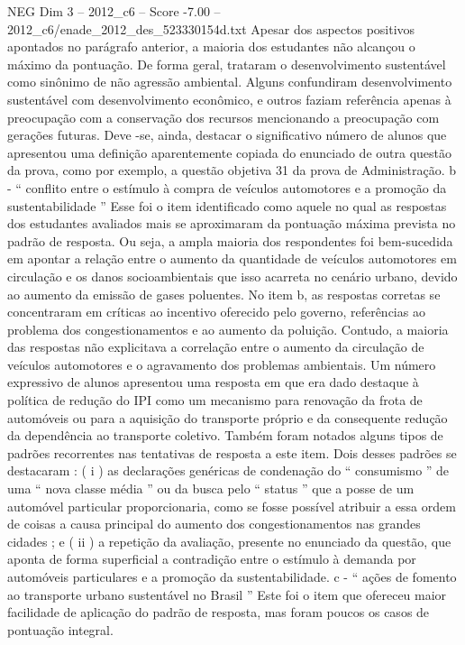 \begin{textsample}{NEG Dim 3 – 2012\_c6 – Score -7.00 – 2012\_c6/enade\_2012\_des\_523330154d.txt}
Apesar dos aspectos positivos apontados no parágrafo anterior, a maioria dos estudantes não alcançou o máximo da pontuação.
De forma geral, trataram o desenvolvimento sustentável como sinônimo de não agressão ambiental.
Alguns confundiram desenvolvimento sustentável com desenvolvimento econômico, e outros faziam referência apenas à preocupação com a conservação dos recursos mencionando a preocupação com gerações futuras.
Deve -se, ainda, destacar o significativo número de alunos que apresentou uma definição aparentemente copiada do enunciado de outra questão da prova, como por exemplo, a questão objetiva 31 da prova de Administração. b - “ conflito entre o estímulo à compra de veículos automotores e a promoção da sustentabilidade ” Esse foi o item identificado como aquele no qual as respostas dos estudantes avaliados mais se aproximaram da pontuação máxima prevista no padrão de resposta.
Ou seja, a ampla maioria dos respondentes foi bem-sucedida em apontar a relação entre o aumento da quantidade de veículos automotores em circulação e os danos socioambientais que isso acarreta no cenário urbano, devido ao aumento da emissão de gases poluentes.
No item b, as respostas corretas se concentraram em críticas ao incentivo oferecido pelo governo, referências ao problema dos congestionamentos e ao aumento da poluição.
Contudo, a maioria das respostas não explicitava a correlação entre o aumento da circulação de veículos automotores e o agravamento dos problemas ambientais.
Um número expressivo de alunos apresentou uma resposta em que era dado destaque à política de redução do IPI como um mecanismo para renovação da frota de automóveis ou para a aquisição do transporte próprio e da consequente redução da dependência ao transporte coletivo.
Também foram notados alguns tipos de padrões recorrentes nas tentativas de resposta a este item.
Dois desses padrões se destacaram : ( i ) as declarações genéricas de condenação do “ consumismo ” de uma “ nova classe média ” ou da busca pelo “ status ” que a posse de um automóvel particular proporcionaria, como se fosse possível atribuir a essa ordem de coisas a causa principal do aumento dos congestionamentos nas grandes cidades ; e ( ii ) a repetição da avaliação, presente no enunciado da questão, que aponta de forma superficial a contradição entre o estímulo à demanda por automóveis particulares e a promoção da sustentabilidade. c - “ ações de fomento ao transporte urbano sustentável no Brasil ” Este foi o item que ofereceu maior facilidade de aplicação do padrão de resposta, mas foram poucos os casos de pontuação integral.

\end{textsample}

